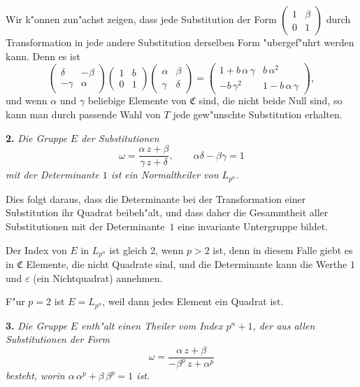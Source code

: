 \documentclass[12pt,a4paper]{article}
\theoremstyle{plain}
\theoremstyle{definition}
\theoremstyle{remark}
\begin{document}
Wir k"onnen zun"achst zeigen, dass jede Substitution der Form $\begin{pmatrix} 1 & \beta \\ 0 & 1 \end{pmatrix}$ durch Transformation in jede andere Substitution derselben Form "ubergef"uhrt werden kann. Denn es ist
\[
\begin{pmatrix} \delta & -\beta \\ -\gamma & \alpha \end{pmatrix}
\begin{pmatrix} 1 & b \\ 0 & 1 \end{pmatrix}
\begin{pmatrix} \alpha & \beta \\ \gamma & \delta \end{pmatrix}
= \begin{pmatrix} 1 + b\,\alpha\,\gamma & b\,\alpha^{2} \\ -b\,\gamma^{2} & 1 - b\,\alpha\,\gamma \end{pmatrix},
\]
und wenn $\alpha$ und $\gamma$ beliebige Elemente von $\mathfrak{C}$ sind, die nicht beide Null sind, so kann man durch passende Wahl von $T$ jede gew"unschte Substitution erhalten.

\medskip\noindent\textbf{2.} \emph{Die Gruppe $E$ der Substitutionen}
\begin{equation}\tag{3}
\omega = \frac{\alpha\,z + \beta}{\gamma\,z + \delta},\qquad
\alpha\delta - \beta\gamma = 1
\end{equation}
\emph{mit der Determinante $1$ ist ein Normaltheiler von $L_{p^{n}}$.}

Dies folgt daraus, dass die Determinante bei der Transformation einer Substitution ihr Quadrat beibeh"alt, und dass daher die Gesammtheit aller Substitutionen mit der Determinante~$1$ eine invariante Untergruppe bildet.

Der Index von $E$ in $L_{p^{n}}$ ist gleich $2$, wenn $p > 2$ ist, denn in diesem Falle giebt es in $\mathfrak{C}$ Elemente, die nicht Quadrate sind, und die Determinante kann die Werthe $1$ und $\varepsilon$ (ein Nichtquadrat) annehmen.

F"ur $p = 2$ ist $E = L_{p^{n}}$, weil dann jedes Element ein Quadrat ist.

\medskip\noindent\textbf{3.} \emph{Die Gruppe $E$ enth"alt einen Theiler vom Index $p^{n} + 1$, der aus allen Substitutionen der Form}
\begin{equation}\tag{4}
\omega = \frac{\alpha\,z + \beta}{-\beta^{p}\,z + \alpha^{p}}
\end{equation}
\emph{besteht, worin $\alpha\,\alpha^{p} + \beta\,\beta^{p} = 1$ ist.}
\end{document}
